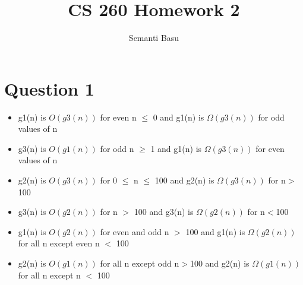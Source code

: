 \documentclass{article}
\begin{document}
\title {CS 260 Homework 2}
\author{Semanti Basu}
\maketitle


\section*{Question 1}
\begin{itemize}
\item g1(n) is $O(g3(n))$ for even n $\leq$ 0 and g1(n) is $\Omega(g3(n))$ for odd values of n
\item g3(n) is $O(g1(n))$ for odd n $\geq$ 1 and g1(n) is $\Omega(g3(n))$ for even values of n
\item g2(n) is $O(g3(n))$ for 0 $\leq$ n $\le$ 100 and g2(n) is $\Omega(g3(n))$ for n$>$100
\item g3(n) is $O(g2(n))$ for n $>$ 100 and g3(n) is $\Omega(g2(n))$ for n$<$100
\item g1(n) is $O(g2(n))$ for even and odd n $>$ 100 and g1(n) is $\Omega(g2(n))$ for all n except even n $<$ 100
\item g2(n) is $O(g1(n))$ for all n except odd n$>$100 and g2(n) is $\Omega(g1(n))$ for all n except n $<$ 100
\end{itemize}
\end{document}
